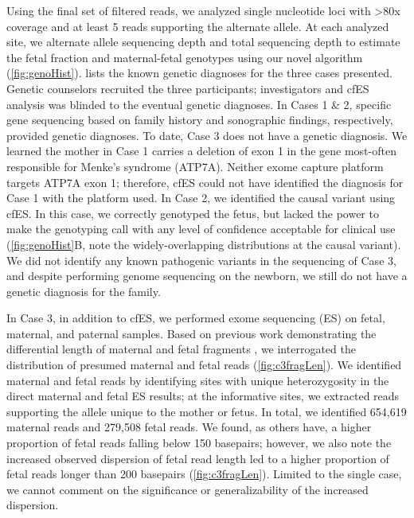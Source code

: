 \documentclass{article}\usepackage[]{graphicx}\usepackage[]{color}
\begin{document}
Using the final set of filtered reads, we analyzed single nucleotide loci with >80x coverage and at least 5 reads supporting the alternate allele.
At each analyzed site, we alternate allele sequencing depth and total sequencing depth to estimate the fetal fraction and maternal-fetal genotypes using our novel algorithm (\cref{fig:genoHist}).
 lists the known genetic diagnoses for the three cases presented.
Genetic counselors recruited the three participants; investigators and cfES analysis was blinded to the eventual genetic diagnoses.
In Cases 1 \& 2, specific gene sequencing based on family history and sonographic findings, respectively, provided genetic diagnoses.
To date, Case 3 does not have a genetic diagnosis.
We learned the mother in Case 1 carries a deletion of exon 1 in the gene most-often responsible for Menke’s syndrome (ATP7A).
Neither exome capture platform targets ATP7A exon 1; therefore, cfES could not have identified the diagnosis for Case 1 with the platform used.
In Case 2, we identified the causal variant using cfES.
In this case, we correctly genotyped the fetus, but lacked the power to make the genotyping call with any level of confidence acceptable for clinical use (\cref{fig:genoHist}B, note the widely-overlapping distributions at the causal variant).
We did not identify any known pathogenic variants in the sequencing of Case 3, and despite performing genome sequencing on the newborn, we still do not have a genetic diagnosis for the family.

In Case 3, in addition to cfES, we performed exome sequencing (ES) on fetal, maternal, and paternal samples.
Based on previous work demonstrating the differential length of maternal and fetal fragments \cite{chan:2004aa,chan:2016aa,jiang:2016ab,rabinowitz:2019aa}, we interrogated the distribution of presumed maternal and fetal reads (\cref{fig:c3fragLen}).
We identified maternal and fetal reads by identifying sites with unique heterozygosity in the direct maternal and fetal ES results; at the informative sites, we extracted reads supporting the allele unique to the mother or fetus.
In total, we identified 654,619 maternal reads and 279,508 fetal reads.
We found, as others have, a higher proportion of fetal reads falling below 150 basepairs; however, we also note the increased observed dispersion of fetal read length led to a higher proportion of fetal reads longer than 200 basepairs (\cref{fig:c3fragLen}).
Limited to the single case, we cannot comment on the significance or generalizability of the increased dispersion.
\end{document}
